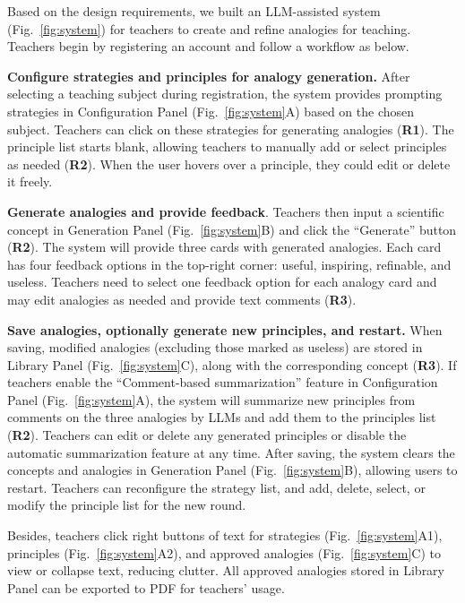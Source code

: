 Based on the design requirements, we built an LLM-assisted system (Fig.~\ref{fig:system}) for teachers to create and refine analogies for teaching. 
Teachers begin by registering an account and follow a workflow as below.

\textbf{Configure strategies and principles for analogy generation.} 
After selecting a teaching subject during registration, the system provides prompting strategies in Configuration Panel (Fig.~\ref{fig:system}A) based on the chosen subject. 
Teachers can click on these strategies for generating analogies (\textbf{R1}).
The principle list starts blank, allowing teachers to manually add or select principles as needed (\textbf{R2}). 
When the user hovers over a principle, they could edit or delete it freely.

\textbf{Generate analogies and provide feedback}. Teachers then input a scientific concept in Generation Panel (Fig.~\ref{fig:system}B) and click the ``Generate'' button (\textbf{R2}). 
The system will provide three cards with generated analogies. 
Each card has four feedback options in the top-right corner: useful, inspiring, refinable, and useless. 
Teachers need to select one feedback option for each analogy card and may edit analogies as needed and provide text comments (\textbf{R3}).

\textbf{Save analogies, optionally generate new principles, and restart.} When saving, modified analogies (excluding those marked as useless) are stored in Library Panel (Fig.~\ref{fig:system}C), along with the corresponding concept (\textbf{R3}). 
If teachers enable the ``Comment-based summarization'' feature in Configuration Panel (Fig.~\ref{fig:system}A), the system will summarize new principles from comments on the three analogies by LLMs and add them to the principles list (\textbf{R2}). 
Teachers can edit or delete any generated principles or disable the automatic summarization feature at any time.
After saving, the system clears the concepts and analogies in Generation Panel (Fig.~\ref{fig:system}B), allowing users to restart. 
Teachers can reconfigure the strategy list, and add, delete, select, or modify the principle list for the new round.

Besides, teachers click right buttons of text for strategies (Fig.~\ref{fig:system}A1), principles (Fig.~\ref{fig:system}A2), and approved analogies (Fig.~\ref{fig:system}C) to view or collapse text, reducing clutter. 
All approved analogies stored in Library Panel can be exported to PDF for teachers' usage.


